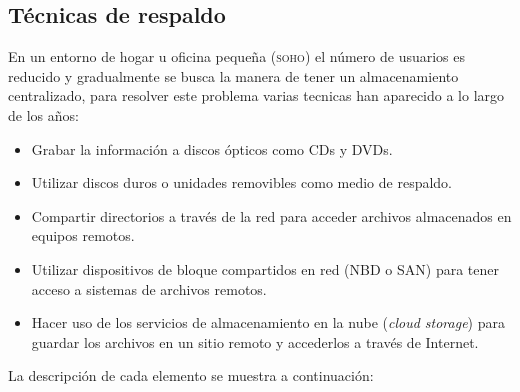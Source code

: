   \subsection {T\'{e}cnicas de respaldo}


En un entorno de hogar u oficina peque\~{n}a (\textsc{soho}) el n\'{u}mero de usuarios es reducido y gradualmente se busca la manera de tener un almacenamiento centralizado, para resolver este problema varias tecnicas han aparecido a lo largo de los a\~{n}os:

    \begin{itemize}
      \item Grabar la informaci\'{o}n a discos \'{o}pticos como CDs y DVDs.
      \item Utilizar discos duros o unidades removibles como medio de respaldo.
      \item Compartir directorios a trav\'{e}s de la red para acceder archivos almacenados en equipos remotos.
      \item Utilizar dispositivos de bloque compartidos en red (\textsc{NBD} o \textsc{SAN}) para tener acceso a sistemas de archivos remotos.
      \item Hacer uso de los servicios de almacenamiento en la nube (\textit{cloud storage}) para guardar los archivos en un sitio remoto y accederlos a trav\'{e}s de Internet.
    \end{itemize}

La descripci\'{o}n de cada elemento se muestra a continuaci\'{o}n:

